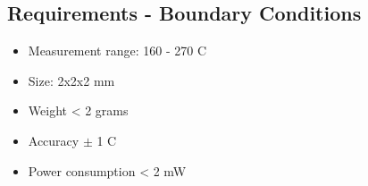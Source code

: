 \subsection{Requirements - Boundary Conditions}

\begin{itemize}

     \item Measurement range: 160 - 270 \degree C
     \item Size: 2x2x2 mm
     \item Weight < 2 grams
     \item Accuracy $\pm$ 1 \degree C
     \item Power consumption < 2 mW
\end{itemize}

